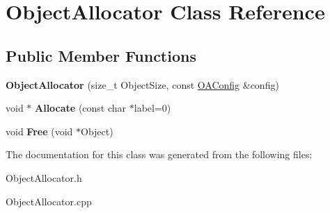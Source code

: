 \hypertarget{classObjectAllocator}{\section{Object\-Allocator Class Reference}
\label{classObjectAllocator}
}
\subsection*{Public Member Functions}
\begin{DoxyCompactItemize}
\item 
\hypertarget{classObjectAllocator_a8f579b514d1fe072f6dc54491868289a}{{\bfseries Object\-Allocator} (size\-\_\-t Object\-Size, const \hyperlink{structOAConfig}{O\-A\-Config} \&config)}\label{classObjectAllocator_a8f579b514d1fe072f6dc54491868289a}

\item 
\hypertarget{classObjectAllocator_a9b102fa9a71e7db59f0915f693133622}{void $\ast$ {\bfseries Allocate} (const char $\ast$label=0)}\label{classObjectAllocator_a9b102fa9a71e7db59f0915f693133622}

\item 
\hypertarget{classObjectAllocator_aa0bfa44d53482b826be0f09ee1bb970c}{void {\bfseries Free} (void $\ast$Object)}\label{classObjectAllocator_aa0bfa44d53482b826be0f09ee1bb970c}

\end{DoxyCompactItemize}


The documentation for this class was generated from the following files\-:\begin{DoxyCompactItemize}
\item 
Object\-Allocator.\-h\item 
Object\-Allocator.\-cpp\end{DoxyCompactItemize}
